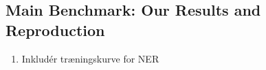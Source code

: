 \documentclass[main.tex]{subfiles}
\begin{document}
\subsection{Main Benchmark: Our Results and Reproduction}
\begin{enumerate}
    \item Inkludér træningskurve for NER
\end{enumerate}





\end{document}
